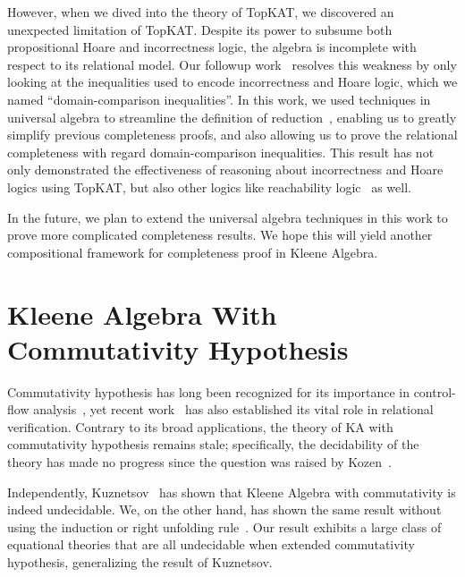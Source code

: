 \documentclass[11pt,a4paper,sans]{moderncv} %
\begin{document}
However, when we dived into the theory of TopKAT, we discovered an unexpected limitation of TopKAT. Despite its power to subsume both propositional Hoare and incorrectness logic, the algebra is incomplete with respect to its relational model. 
Our followup work~\cite{zhang_DomainReasoningTopKAT_2024} resolves this weakness by only looking at the inequalities used to encode incorrectness and Hoare logic, which we named ``domain-comparison inequalities''. 
In this work, we used techniques in universal algebra to streamline the definition of reduction~\cite{pous_ToolsCompletenessKleene_2021,kozen_KleeneAlgebraTests_1997c}, enabling us to greatly simplify previous completeness proofs, and also allowing us to prove the relational completeness with regard domain-comparison inequalities. 
This result has not only demonstrated the effectiveness of reasoning about incorrectness and Hoare logics using TopKAT, but also other logics like reachability logic~\cite{naus_ReachabilityLogicLowLevel_2022a} as well.

In the future, we plan to extend the universal algebra techniques in this work to prove more complicated completeness results. We hope this will yield another compositional framework for completeness proof in Kleene Algebra.

\newpage
\section{Kleene Algebra With Commutativity Hypothesis}

Commutativity hypothesis has long been recognized for its importance in control-flow analysis~\cite{kozen_KleeneAlgebraTests_1996}, yet recent work~\cite{antonopoulos_AlgebraAlignmentRelational_2023} has also established its vital role in relational verification. 
Contrary to its broad applications, the theory of KA with commutativity hypothesis remains stale; specifically, the decidability of the theory has made no progress since the question was raised by Kozen~\cite{kozen_KleeneAlgebraTests_1996}.

Independently, Kuznetsov~\cite{kuznetsov_ComplexityReasoningKleene_2023} has shown that Kleene Algebra with commutativity is indeed undecidable. We, on the other hand, has shown the same result without using the induction or right unfolding rule~\cite{azevedodeamorim_KleeneAlgebraCommutativity_2024}. 
Our result exhibits a large class of equational theories that are all undecidable when extended commutativity hypothesis, generalizing the result of Kuznetsov.
\end{document}
